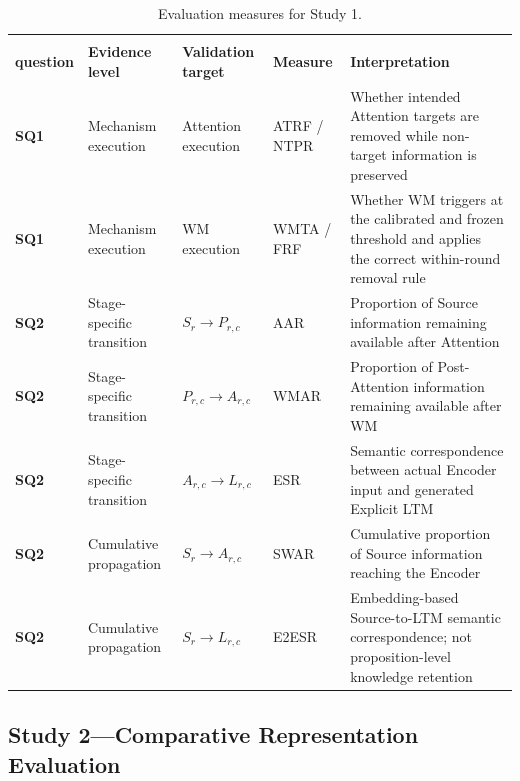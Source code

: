 \begin{table}[H]
\centering
\caption{Evaluation measures for Study 1.}
\label{tab:study1-measures}
\scriptsize
\setlength{\tabcolsep}{3pt}
\renewcommand{\arraystretch}{1.15}
\begin{tabularx}{\textwidth}{>{\raggedright\arraybackslash}p{}>{\raggedright\arraybackslash}p{}>{\raggedright\arraybackslash}p{}>{\raggedright\arraybackslash}p{}>{\raggedright\arraybackslash}X}
\toprule
\makecell{\textbf{Sub-}\\\textbf{question}} & \textbf{Evidence level} & \textbf{Validation target} & \textbf{Measure} & \textbf{Interpretation} \\
\midrule
\textbf{SQ1} & Mechanism execution & Attention execution & ATRF / NTPR & Whether intended Attention targets are removed while non-target information is preserved \\
\textbf{SQ1} & Mechanism execution & WM execution & WMTA / FRF & Whether WM triggers at the calibrated and frozen threshold and applies the correct within-round removal rule \\
\textbf{SQ2} & Stage-specific transition & $S_r\rightarrow P_{r,c}$ & AAR & Proportion of Source information remaining available after Attention \\
\textbf{SQ2} & Stage-specific transition & $P_{r,c}\rightarrow A_{r,c}$ & WMAR & Proportion of Post-Attention information remaining available after WM \\
\textbf{SQ2} & Stage-specific transition & $A_{r,c}\rightarrow L_{r,c}$ & ESR & Semantic correspondence between actual Encoder input and generated Explicit LTM \\
\textbf{SQ2} & Cumulative propagation & $S_r\rightarrow A_{r,c}$ & SWAR & Cumulative proportion of Source information reaching the Encoder \\
\textbf{SQ2} & Cumulative propagation & $S_r\rightarrow L_{r,c}$ & E2ESR & Embedding-based Source-to-LTM semantic correspondence; not proposition-level knowledge retention \\
\bottomrule
\end{tabularx}
\end{table}

\subsection{Study 2---Comparative Representation Evaluation}
\label{subsec:study2-design}


